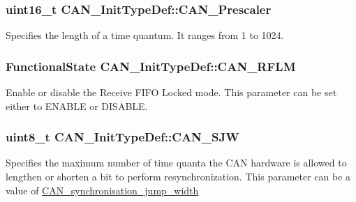 \subsubsection[{C\+A\+N\+\_\+\+Prescaler}]{\setlength{\rightskip}{0pt plus 5cm}uint16\+\_\+t C\+A\+N\+\_\+\+Init\+Type\+Def\+::\+C\+A\+N\+\_\+\+Prescaler}\label{struct_c_a_n___init_type_def_a3e91dbcbf30b893a9bd6a65606cb8fe9}
Specifies the length of a time quantum. It ranges from 1 to 1024. \hypertarget{struct_c_a_n___init_type_def_aa63787683c0ad533b513fb60355d76f1}{}
\subsubsection[{C\+A\+N\+\_\+\+R\+F\+L\+M}]{\setlength{\rightskip}{0pt plus 5cm}Functional\+State C\+A\+N\+\_\+\+Init\+Type\+Def\+::\+C\+A\+N\+\_\+\+R\+F\+L\+M}\label{struct_c_a_n___init_type_def_aa63787683c0ad533b513fb60355d76f1}
Enable or disable the Receive F\+I\+F\+O Locked mode. This parameter can be set either to E\+N\+A\+B\+L\+E or D\+I\+S\+A\+B\+L\+E. \hypertarget{struct_c_a_n___init_type_def_addac271c43490cb37ac7293f7bf201c2}{}
\subsubsection[{C\+A\+N\+\_\+\+S\+J\+W}]{\setlength{\rightskip}{0pt plus 5cm}uint8\+\_\+t C\+A\+N\+\_\+\+Init\+Type\+Def\+::\+C\+A\+N\+\_\+\+S\+J\+W}\label{struct_c_a_n___init_type_def_addac271c43490cb37ac7293f7bf201c2}
Specifies the maximum number of time quanta the C\+A\+N hardware is allowed to lengthen or shorten a bit to perform resynchronization. This parameter can be a value of \hyperlink{group___c_a_n__synchronisation__jump__width}{C\+A\+N\+\_\+synchronisation\+\_\+jump\+\_\+width} \hypertarget{struct_c_a_n___init_type_def_aa53ceafdcf1a9a5c9a6566006c9a4b60}{}

